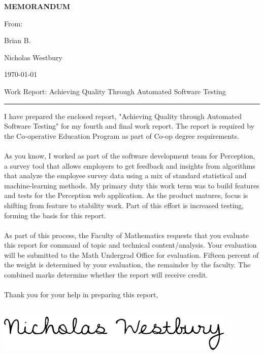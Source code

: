 \documentclass[12pt]{report}
\newcommand{\HRule}[1]{\rule{\linewidth}{#1}}
\begin{document}
\newpage\noindent\thispagestyle{empty}
\linespread{1.2}
\LARGE\textbf{\uppercase{MEMORANDUM}} \normalsize
\vspace*{-10pt}
\begin{singlespacing}\noindent
\begin{labeling}{From:\ \ \ \ \ \ \ }
    \item [To:] Brian B.
    \item [From:] Nicholas Westbury
    \item [Date:] \today
    \item [Re:] Work Report: Achieving Quality Through Automated Software Testing
\end{labeling}
\end{singlespacing}
\vspace*{-10pt}
\HRule{1.5pt}
\begin{singlespacing}\noindent
I have prepared the enclosed report, "Achieving Quality through Automated Software Testing" for my fourth and final work report. The report is required by the Co-operative Education Program as part of Co-op degree requirements. \\ \\ \noindent 
As you know, I worked as part of the software development team for Perception, a survey tool that allows employers to get feedback and insights from algorithms that analyze the employee survey data using a mix of standard statistical and machine-learning methods. My primary duty this work term was to build features and tests for the Perception web application. As the product matures, focus is shifting from feature to stability work. Part of this effort is increased testing, forming the basis for this report. \\ \\ \noindent
As part of this process, the Faculty of Mathematics requests that you evaluate this report for command of topic and technical content/analysis. Your evaluation will be submitted to the Math Undergrad Office for evaluation. Fifteen percent of the weight is determined by your evaluation, the remainder by the faculty. The combined marks determine whether the report will receive credit. \\ \\
Thank you for your help in preparing this report,\\ \\ \noindent
\end{singlespacing}
\includegraphics[scale=0.55]{signature}
\linespread{2}
\end{document}
